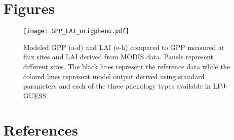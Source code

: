 \documentclass[]{article}
\begin{document}
\section{Figures}
\begin{figure}[!htbp]
\begin{measuredfigure}
	\texttt{[image: GPP\_LAI\_origpheno.pdf]}
	\caption{Modeled GPP (a-d) and LAI (e-h) compared to GPP measured at flux sites and LAI derived from MODIS data. Panels represent different sites. The black lines represent the reference data while the colored lines represent model output derived using standard parameters and each of the three phenology types available in LPJ-GUESS.}
	\label{fig:origpheno}
	\end{measuredfigure}
\end{figure}

\section{References}


\end{document}
